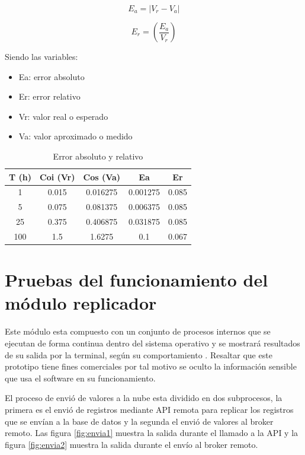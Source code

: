 \begin{equation}
	\label{eq:ea}
	E_a = \left| V_r - V_a \right|
\end{equation}

\begin{equation}
	\label{eq:er}
	E_r = \left( \frac{E_a}{V_r} \right)
\end{equation}

\vspace{0.1cm}
Siendo las variables:
\begin{itemize}
\item Ea: error absoluto 
\item Er: error relativo
\item Vr: valor real o esperado
\item Va: valor aproximado o medido
\end{itemize}

\vspace{0.5cm}
\begin{table}[h]
	\centering
	\caption[Error absoluto y relativo]{Error absoluto y relativo}
	\begin{tabular}{c c c c c}    
		\toprule
		\textbf{T (h)} & \textbf{Coi (Vr)} &\textbf{Cos (Va)} &\textbf{Ea} &\textbf{Er}\\
		\midrule
		1 & 0.015 & 0.016275 & 0.001275 & 0.085 \\		
		5 & 0.075 & 0.081375 & 0.006375 & 0.085 \\
		25 & 0.375 & 0.406875 & 0.031875 & 0.085\\		
		100 & 1.5 & 1.6275 & 0.1 & 0.067\\		
		
		\bottomrule
		\hline
	\end{tabular}
	\label{tab:tablaerror}
\end{table}

\section{Pruebas del funcionamiento del módulo replicador}

Este módulo esta compuesto con un conjunto de procesos internos que se ejecutan de forma continua dentro del sistema operativo y se mostrará resultados de su salida por la terminal, según su comportamiento . Resaltar que este prototipo tiene fines comerciales por tal motivo se oculto la información sensible que usa el software en su funcionamiento.

El proceso de envió de valores a la nube esta dividido en dos subprocesos, la primera es el envió de registros mediante API remota para replicar los registros que se envían a la base de datos y la segunda el envió de valores al broker remoto. Las figura \ref{fig:envia1} muestra la salida durante el llamado a la API y la figura \ref{fig:envia2} muestra la salida durante el envío al broker remoto.

